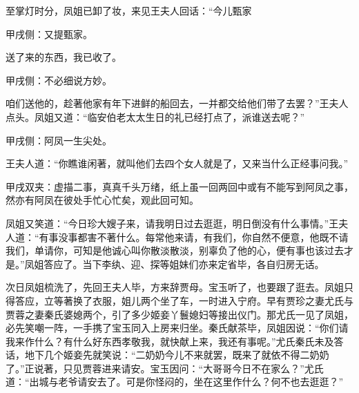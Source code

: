 \begin{parag}
    至掌灯时分，凤姐已卸了妆，来见王夫人回话：“今儿甄家\begin{note}甲戌侧：又提甄家。\end{note}送了来的东西，我已收了。\begin{note}甲戌侧：不必细说方妙。\end{note}咱们送他的，趁著他家有年下进鲜的船回去，一并都交给他们带了去罢？”王夫人点头。凤姐又道：“临安伯老太太生日的礼已经打点了，派谁送去呢？”\begin{note}甲戌侧：阿凤一生尖处。\end{note}王夫人道：“你瞧谁闲著，就叫他们去四个女人就是了，又来当什么正经事问我。”\begin{note}甲戌双夹：虚描二事，真真千头万绪，纸上虽一回两回中或有不能写到阿凤之事，然亦有阿凤在彼处手忙心忙矣，观此回可知。\end{note}凤姐又笑道：“今日珍大嫂子来，请我明日过去逛逛，明日倒没有什么事情。”王夫人道：“有事没事都害不著什么。每常他来请，有我们，你自然不便意，他既不请我们，单请你，可知是他诚心叫你散淡散淡，别辜负了他的心，便有事也该过去才是。”凤姐答应了。当下李纨、迎、探等姐妹们亦来定省毕，各自归房无话。
\end{parag}


\begin{parag}
    次日凤姐梳洗了，先回王夫人毕，方来辞贾母。宝玉听了，也要跟了逛去。凤姐只得答应，立等著换了衣服，姐儿两个坐了车，一时进入宁府。早有贾珍之妻尤氏与贾蓉之妻秦氏婆媳两个，引了多少姬妾丫鬟媳妇等接出仪门。那尤氏一见了凤姐，必先笑嘲一阵，一手携了宝玉同入上房来归坐。秦氏献茶毕，凤姐因说：“你们请我来作什么？有什么好东西孝敬我，就快献上来，我还有事呢。”尤氏秦氏未及答话，地下几个姬妾先就笑说：“二奶奶今儿不来就罢，既来了就依不得二奶奶了。”正说著，只见贾蓉进来请安。宝玉因问：“大哥哥今日不在家么？”尤氏道：“出城与老爷请安去了。可是你怪闷的，坐在这里作什么？何不也去逛逛？”
\end{parag}


